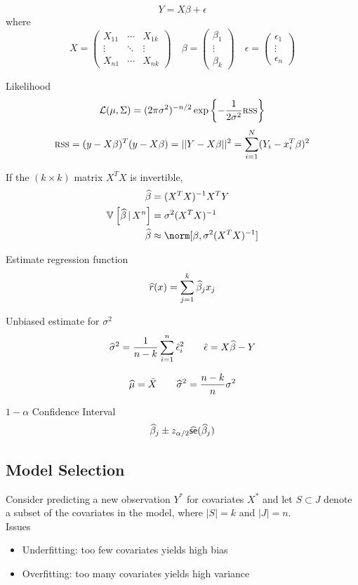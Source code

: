 \documentclass[landscape]{article}
\begin{document}
\begin{multicols*}{2}
$$Y = X\beta + \epsilon$$
where
$$X = 
\begin{pmatrix} X_{11} & \cdots & X_{1k} \\ \vdots & \ddots & \vdots \\ 
  X_{n1} & \cdots & X_{nk}\end{pmatrix} \quad
\beta = \begin{pmatrix}\beta_1 \\ \vdots \\ \beta_k\end{pmatrix} \quad
\epsilon = \begin{pmatrix}\epsilon_1 \\ \vdots \\ \epsilon_n\end{pmatrix}$$

Likelihood
$$\mathcal{L}(\mu,\Sigma) = (2\pi\sigma^2)^{-n/2} \exp\left\{-\frac{1}{2\sigma^2}\textsc{rss}\right\}$$
$$\textsc{rss} = (y-X\beta)^T(y-X\beta) = ||Y-X\beta||^2 = \sum_{i=1}^N(Y_i-x_i^T\beta)^2$$

If the $(k \times k)$ matrix $X^TX$ is invertible,
\begin{align*}
  \bhat &= (X^TX)^{-1}X^TY \\
  \V{\bhat \giv X^n} &= \sigma^2(X^TX)^{-1} \\
  \bhat &\approx \norm[\beta, \sigma^2(X^TX)^{-1}]
\end{align*}

Estimate regression function
$$\widehat{r}(x) = \sum_{j=1}^k\widehat{\beta}_j x_j$$

Unbiased estimate for $\sigma^2$
$$\widehat{\sigma}^2 = \frac{1}{n-k} \sum_{i=1}^n \hat{\epsilon}_i^2 \qquad \hat{\epsilon} = X\widehat{\beta}-Y$$

\mle 
$$\widehat{\mu} = \bar{X} \qquad \widehat{\sigma}^2 = \frac{n-k}{n}\sigma^2$$

$1-\alpha$ Confidence Interval
$$\widehat{\beta}_j \pm z_{\alpha/2}\widehat{\textsf{se}}(\widehat{\beta}_j)$$

\subsection{Model Selection}

Consider predicting a new observation $Y^*$ for covariates $X^*$ and let 
$S \subset J$ denote a subset of the covariates in the model, where $|S| = k$
and $|J| = n$.\\

Issues
\begin{itemize}
  \item Underfitting: too few covariates yields high bias
  \item Overfitting: too many covariates yields high variance
\end{itemize}


\end{multicols*}
\end{document}
